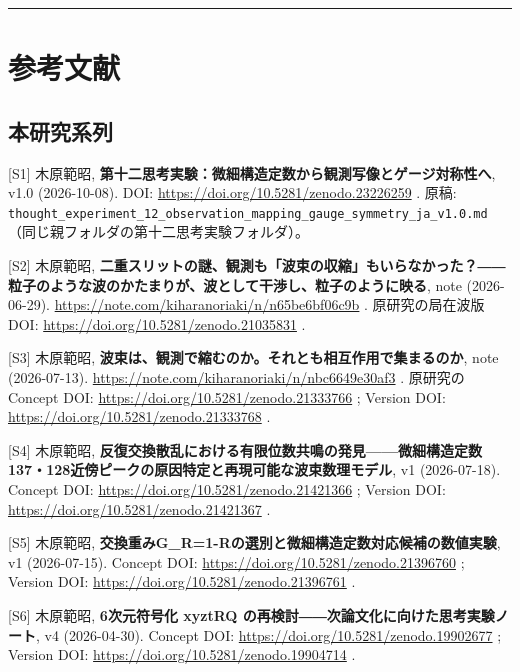 \documentclass[
  a4paper,
]{ltjsarticle}
\begin{document}
\begin{center}\rule{0.5\linewidth}{0.5pt}\end{center}

\section{参考文献}\label{ux53c2ux8003ux6587ux732e}

\subsection{本研究系列}\label{ux672cux7814ux7a76ux7cfbux5217}

{[}S1{]} 木原範昭,
\textbf{第十二思考実験：微細構造定数から観測写像とゲージ対称性へ}, v1.0
(2026-10-08). DOI: \url{https://doi.org/10.5281/zenodo.23226259} . 原稿:
\texttt{thought\_\allowbreak{}experiment\_\allowbreak{}12\_\allowbreak{}observation\_\allowbreak{}mapping\_\allowbreak{}gauge\_\allowbreak{}symmetry\_\allowbreak{}ja\_\allowbreak{}v1.0.md}（同じ親フォルダの第十二思考実験フォルダ）。

{[}S2{]} 木原範昭,
\textbf{二重スリットの謎、観測も「波束の収縮」もいらなかった？――粒子のような波のかたまりが、波として干渉し、粒子のように映る},
note (2026-06-29). \url{https://note.com/kiharanoriaki/n/n65be6bf06c9b} .
原研究の局在波版 DOI: \url{https://doi.org/10.5281/zenodo.21035831} .

{[}S3{]} 木原範昭,
\textbf{波束は、観測で縮むのか。それとも相互作用で集まるのか}, note
(2026-07-13). \url{https://note.com/kiharanoriaki/n/nbc6649e30af3} . 原研究の
Concept DOI: \url{https://doi.org/10.5281/zenodo.21333766} ; Version DOI:
\url{https://doi.org/10.5281/zenodo.21333768} .

{[}S4{]} 木原範昭,
\textbf{反復交換散乱における有限位数共鳴の発見------微細構造定数137・128近傍ピークの原因特定と再現可能な波束数理モデル},
v1 (2026-07-18). Concept DOI: \url{https://doi.org/10.5281/zenodo.21421366} ;
Version DOI: \url{https://doi.org/10.5281/zenodo.21421367} .

{[}S5{]} 木原範昭,
\textbf{交換重みG\_R=1-Rの選別と微細構造定数対応候補の数値実験}, v1
(2026-07-15). Concept DOI: \url{https://doi.org/10.5281/zenodo.21396760} ;
Version DOI: \url{https://doi.org/10.5281/zenodo.21396761} .

{[}S6{]} 木原範昭, \textbf{6次元符号化 xyztRQ
の再検討――次論文化に向けた思考実験ノート}, v4 (2026-04-30). Concept DOI:
\url{https://doi.org/10.5281/zenodo.19902677} ; Version DOI:
\url{https://doi.org/10.5281/zenodo.19904714} .
\end{document}
